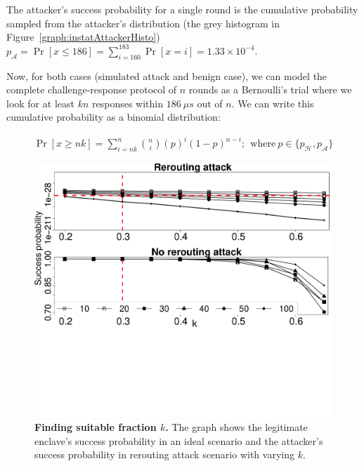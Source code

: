 The attacker's success probability for a single round is the cumulative probability sampled from the attacker's distribution (the grey histogram in Figure~\ref{graph:instatAttackerHisto}) $p_\mathcal{A} = \Pr[x \leq 186] = \sum_{i=160}^{183}\Pr[x=i] = 1.33 \times 10^{-4}$.


Now, for both cases (simulated attack and benign case), we can model the complete challenge-response protocol of $n$ rounds as a Bernoulli's trial where we look for at least $kn$ responses within $186\ \mu s$ out of $n$. We can write this cumulative probability as a binomial distribution:
%

\begin{align*}
    \Pr[x \geq nk] = \sum_{i=nk}^n\binom{n}{i} (p)^{i}(1-p)^{n-i};~~\text{where}~ p \in \{p_\mathcal{H}, p_\mathcal{A}\}
\end{align*}

\begin{figure}[t]
  \centering
    \includegraphics[trim={0 10cm 0 0}, clip, width=\linewidth]{chapters/ProximiTEE/data/fx3_data/round_comp_new.pdf}
    \caption[Finding suitable fraction $k$]{\textbf{Finding suitable fraction $k$.} The graph shows the legitimate enclave's success probability in an ideal scenario and the attacker's success probability in rerouting attack scenario with varying $k$.}
    \label{graph:roundSuccess}
\end{figure}



